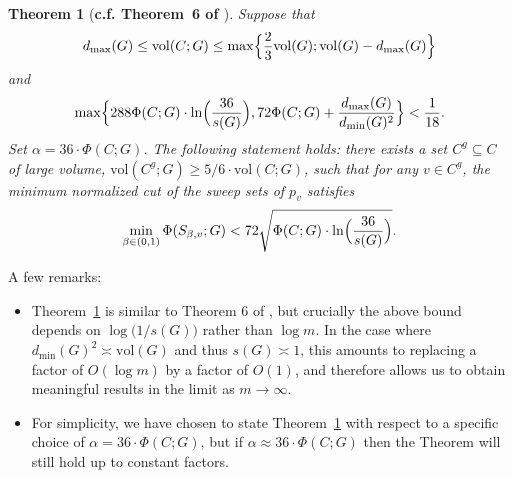 \documentclass{article}
\newcommand{\vol}{\mathrm{vol}}
\newcommand{\1}{\mathbf{1}}
\newtheorem{theorem}{Theorem}[section]
\theoremstyle{definition}
\theoremstyle{remark}
\begin{document}
\begin{theorem}[\textbf{c.f. Theorem~6 of \cite{andersen2006}}]
	\label{thm:normalized_cut_ppr}
	Suppose that
	\begin{equation}
	\label{eqn:normalized_cut_ppr_vol}
	d_{\max}(G) \leq \vol(C;G) \leq \max\Bigl\{\frac{2}{3}\vol(G); \vol(G) - d_{\max}(G)\Bigr\}
	\end{equation}
	and
	\begin{equation}
	\label{eqn:normalized_cut_ppr_ncut}
	\max\Bigl\{288\Phi(C;G)\cdot \ln\Bigl(\frac{36}{s(G)}\Bigr),72\Phi(C;G) + \frac{d_{\max}(G)}{d_{\min}(G)^2}\Bigr\} < \frac{1}{18}.
	\end{equation}
	Set $\alpha = 36 \cdot \Phi(C;G)$. The following statement holds: there exists a set $C^g \subseteq C$ of large volume, $\vol(C^g;G) \geq 5/6 \cdot \vol(C;G)$, such that for any $v \in C^g$,  the minimum normalized cut of the sweep sets of $p_v$ satisfies 
	\begin{equation}
	\label{eqn:normalized_cut_ppr}
	\min_{\beta \in (0,1)}\Phi(S_{\beta,v};G) < 72\sqrt{\Phi(C;G) \cdot \ln\Bigl(\frac{36}{s(G)}\Bigr)}.
	\end{equation}
\end{theorem}
A few remarks:
\begin{itemize}
	\item Theorem~\ref{thm:normalized_cut_ppr} is similar to Theorem 6 of \citet{andersen2006}, but crucially the above bound depends on $\log\bigl(1/s(G)\bigr)$ rather than $\log m$. In the case where $d_{\min}(G)^2 \asymp \vol(G)$ and thus $s(G) \asymp 1$, this amounts to replacing a factor of $O(\log m)$ by a factor of ${O}(1)$, and therefore allows us to obtain meaningful results in the limit as $m \to \infty$. 
	\item For simplicity, we have chosen to state Theorem~\ref{thm:normalized_cut_ppr} with respect to a specific choice of $\alpha = 36 \cdot \Phi(C;G)$, but if $\alpha \approx 36 \cdot \Phi(C;G)$ then the Theorem will still hold up to constant factors.
\end{itemize}
\end{document}
